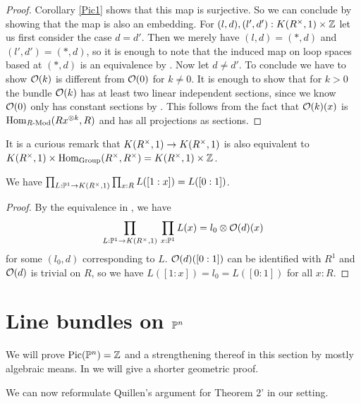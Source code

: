 \begin{proof}
  Corollary \ref{Pic1} shows that this map is surjective.
  So we can conclude by showing that the map is also an embedding.
  For $(l,d),(l',d'):K(R^{\times},1)\times\mathbb{Z}$ let us first consider the case $d=d'$. 
  Then we merely have $(l,d)=(\ast,d)$ and $(l',d')=(\ast,d)$,
  so it is enough to note that the induced map on loop spaces based at $(\ast,d)$ is an equivalence by .
  Now let $d\neq d'$. To conclude we have to show $\mathcal{O}(k)$ is different from $\mathcal{O}(0)$ for $k\neq 0$.
  It is enough to show that for $k>0$ the bundle $\mathcal{O}(k)$ has at least two linear independent sections,
  since we know $\mathcal{O}(0)$ only has constant sections by .
  This follows from the fact that $\mathcal{O}(k)(x)$ is $\mathrm{Hom}_{R\text{-}\mathrm{Mod}}(Rx^{\otimes k},R)$ and has all projections as sections.
\end{proof}

 It is a curious remark that $K(R^{\times},1)\rightarrow K(R^{\times},1)$ is also equivalent
 to $K(R^{\times},1)\times \mathrm{Hom}_{\mathrm{Group}}(R^\times,R^\times) = K(R^{\times},1)\times\mathbb{Z}$.

\begin{corollary}\label{Matthias1}
  We have $\prod_{L:\mathbb{P}^1\rightarrow K(R^{\times},1)}\prod_{x:R}L([1:x]) = L([0:1])$.
\end{corollary}

\begin{proof}
  By the equivalence in , we have
  \[ \prod_{L:\mathbb{P}^1\to K(R^{\times},1)} \,\prod_{x : \mathbb{P}^1}  L(x)=l_0\otimes \mathcal{O}(d)(x) \]
  for some $(l_0,d)$ corresponding to $L$.
  $\mathcal{O}(d)([0:1])$ can be identified with $R^1$ and $\mathcal{O}(d)$ is trivial on $R$,
  so we have $L([1:x])=l_0=L([0:1])$ for all $x:R$.
\end{proof}

\section{Line bundles on $\mathbb{P}^n$}
We will prove $\mathrm{Pic}(\mathbb{P}^n)=\mathbb{Z}$ and a strengthening thereof in this section by mostly algebraic means.
In  we will give a shorter geometric proof.

We can now reformulate Quillen's argument for Theorem 2' \cite{Quillen} in our setting.

